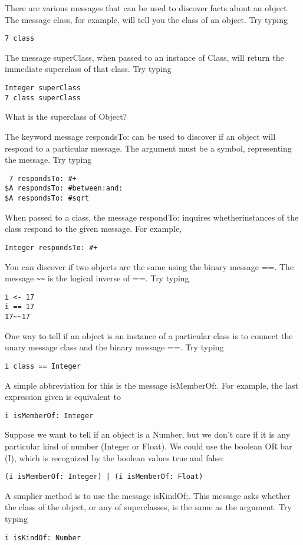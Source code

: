 
There are various messages that can be used to discover facts about an
object. The message class, for example, will tell you the class of an object.
Try typing
\begin{lstlisting}
7 class
\end{lstlisting}
The message superClass, when passed to an instance of Class, will return
the immediate superclass of that class. Try typing
\begin{lstlisting}
Integer superClass
7 class superClass
\end{lstlisting}
What is the superclass of Object?

The keyword message respondsTo: can be used to discover if an object
will respond to a particular message. The argument must be a symbol,
representing the message. Try typing
\begin{lstlisting}
 7 respondsTo: #+
$A respondsTo: #between:and:
$A respondsTo: #sqrt
\end{lstlisting}
When passed to a ciass, the message respondTo: inquires whetherinstances
of the class respond to the given message. For example,
\begin{lstlisting}
Integer respondsTo: #+
\end{lstlisting}

You can discover if two objects are the same using the binary message
==. The message \verb|~~| is the logical inverse of ==. Try typing
\begin{lstlisting}
i <- 17
i == 17
17~~17
\end{lstlisting}

One way to tell if an object is an instance of a particular class is to
connect the unary message class and the binary message ==. Try typing
\begin{lstlisting}
i class == Integer
\end{lstlisting}

A simple abbreviation for this is the message isMemberOf:. For example, the last expression given is equivalent to
\begin{lstlisting}
i isMemberOf: Integer
\end{lstlisting}

Suppose we want to tell if an object is a Number, but we don't care if
it is any particular kind of number (Integer or Float). We could use the
boolean OR bar (I), which is recognized by the boolean values true and
false:
\begin{lstlisting}
(i isMemberOf: Integer) | (i isMemberOf: Float)
\end{lstlisting}
A simplier method is to use the message isKindOf;. This message asks
whether the class of the object, or any of superclasses, is the same as the
argument. Try typing
\begin{lstlisting}
i isKindOf: Number
\end{lstlisting}
